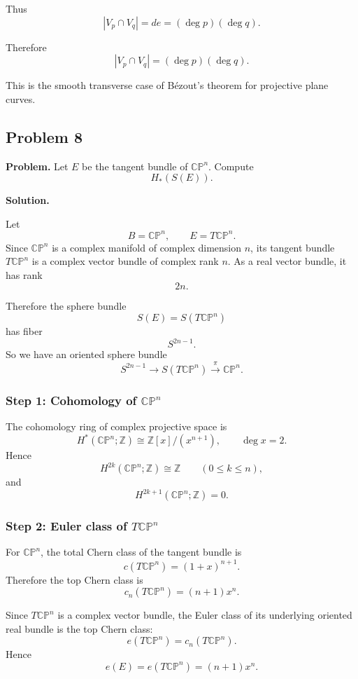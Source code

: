 \documentclass[12pt,a4paper]{article}
\theoremstyle{notespace}
\begin{document}
Thus
\[
|V_p\cap V_q|
=
de
=
(\deg p)(\deg q).
\]

Therefore
\[
\boxed{
	|V_p\cap V_q|=(\deg p)(\deg q).
}
\]

This is the smooth transverse case of B\'ezout's theorem for projective plane
curves.

\subsection{Problem 8}

\textbf{Problem.}
Let \(E\) be the tangent bundle of \(\mathbb{CP}^n\). Compute
\[
H_*(S(E)).
\]

\medskip

\noindent\textbf{Solution.}

Let
\[
B=\mathbb{CP}^n,
\qquad
E=T\mathbb{CP}^n.
\]
Since \(\mathbb{CP}^n\) is a complex manifold of complex dimension \(n\), its
tangent bundle \(T\mathbb{CP}^n\) is a complex vector bundle of complex rank
\(n\). As a real vector bundle, it has rank
\[
2n.
\]

Therefore the sphere bundle
\[
S(E)=S(T\mathbb{CP}^n)
\]
has fiber
\[
S^{2n-1}.
\]
So we have an oriented sphere bundle
\[
S^{2n-1}
\longrightarrow
S(T\mathbb{CP}^n)
\xrightarrow{\ \pi\ }
\mathbb{CP}^n.
\]

\subsubsection*{Step 1: Cohomology of \(\mathbb{CP}^n\)}

The cohomology ring of complex projective space is
\[
H^*(\mathbb{CP}^n;\mathbb Z)
\cong
\mathbb Z[x]/(x^{n+1}),
\qquad
\deg x=2.
\]
Hence
\[
H^{2k}(\mathbb{CP}^n;\mathbb Z)\cong \mathbb Z
\qquad
(0\le k\le n),
\]
and
\[
H^{2k+1}(\mathbb{CP}^n;\mathbb Z)=0.
\]

\subsubsection*{Step 2: Euler class of \(T\mathbb{CP}^n\)}

For \(\mathbb{CP}^n\), the total Chern class of the tangent bundle is
\[
c(T\mathbb{CP}^n)=(1+x)^{n+1}.
\]
Therefore the top Chern class is
\[
c_n(T\mathbb{CP}^n)=(n+1)x^n.
\]

Since \(T\mathbb{CP}^n\) is a complex vector bundle, the Euler class of its
underlying oriented real bundle is the top Chern class:
\[
e(T\mathbb{CP}^n)=c_n(T\mathbb{CP}^n).
\]
Hence
\[
e(E)
=
e(T\mathbb{CP}^n)
=
(n+1)x^n.
\]
\end{document}
